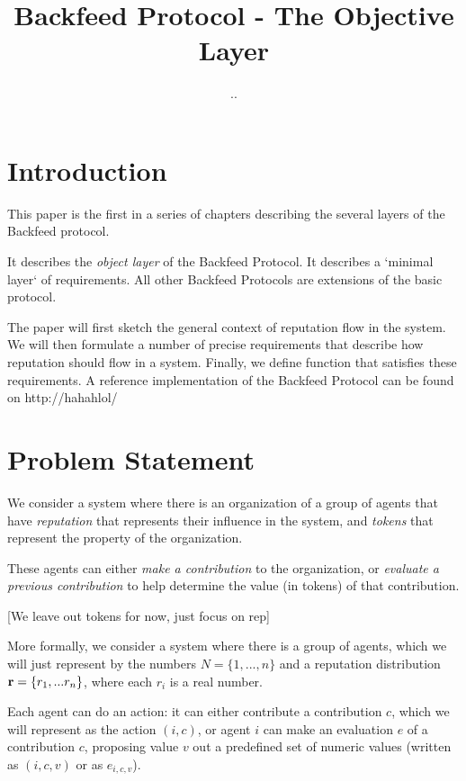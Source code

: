 \documentclass{article}
\begin{document}
\title{Backfeed Protocol - The Objective Layer}
\author{..}
\date{}
\maketitle

\section{Introduction}

This paper is the first in a series of chapters describing the several layers of the Backfeed protocol. 

It describes the {\em object layer} of the Backfeed Protocol. It describes a `minimal layer` of requirements. All other Backfeed Protocols are extensions of the basic protocol.

The paper will first sketch the general context of reputation flow in the system. 
We will then formulate a number of precise requirements that describe how reputation should flow in a system. Finally, we define function that satisfies these requirements. 
A reference implementation of the Backfeed Protocol can be found on http://hahahlol/

\section{Problem Statement}

We consider a system where there is an organization of a group of agents that have {\em reputation} that represents their influence in the system, and {\em tokens} that represent the property of the organization.

These agents can either {\em make a contribution} to the organization, or {\em evaluate a previous contribution} to help determine the value (in tokens) of that contribution. 


[We leave out tokens for now, just focus on rep]

More formally, we consider a system where there is a group of agents, which we will just represent by the numbers $N = \{1, ... , n\}$ and a reputation distribution ${\bf r} = \{r_1, ... r_n\}$, where each $r_i$ is a real number.
 
Each agent can do an action: it can either contribute a contribution $c$, which we will represent as the action $(i, c)$, or agent $i$ can make an evaluation $e$ of a contribution $c$, proposing value $v$ out a predefined set of numeric values (written as $(i,c,v)$ or as $e_{i,c,v}$).
\end{document}
